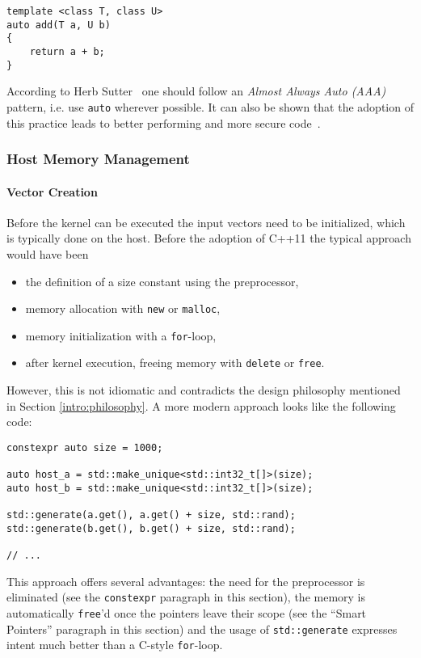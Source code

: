 \begin{verbatim}
template <class T, class U>
auto add(T a, U b)
{
    return a + b;
}
\end{verbatim}

\noindent According to Herb Sutter~\cite{sutteraaa} one should follow an \textit{Almost Always Auto (AAA)} pattern, i.e. use \texttt{auto} wherever possible. It can also be shown that the adoption of this practice leads to better performing and more secure code~\cite{sutter_cppcon}.

\subsubsection{Host Memory Management}\label{modern:vec_add:host_mem}

\paragraph{Vector Creation}

Before the kernel can be executed the input vectors need to be initialized, which is typically done on the host. Before the adoption of C++11 the typical approach would have been
\begin{itemize}
\item the definition of a size constant using the preprocessor,
\item memory allocation with \texttt{new} or \texttt{malloc},
\item memory initialization with a \texttt{for}-loop,
\item after kernel execution, freeing memory with \texttt{delete} or \texttt{free}.
\end{itemize}

\noindent However, this is not idiomatic and contradicts the design philosophy mentioned in Section \ref{intro:philosophy}. A more modern approach looks like the following code:

\begin{verbatim}
constexpr auto size = 1000;

auto host_a = std::make_unique<std::int32_t[]>(size);
auto host_b = std::make_unique<std::int32_t[]>(size);

std::generate(a.get(), a.get() + size, std::rand);
std::generate(b.get(), b.get() + size, std::rand);

// ...
\end{verbatim}

\noindent This approach offers several advantages: the need for the preprocessor is eliminated (see the \texttt{constexpr} paragraph in this section), the memory is automatically \texttt{free}'d once the pointers leave their scope (see the ``Smart Pointers'' paragraph in this section) and the usage of \texttt{std::generate} expresses intent much better than a C-style \texttt{for}-loop.

